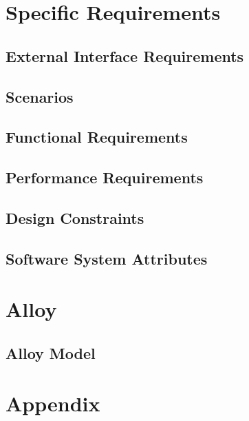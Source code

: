 \documentclass[a4paper,12pt]{report}
\begin{document}
	\chapter{Specific Requirements}
	\label{ch:Specific_Requirements}

	\section{External Interface Requirements}
	

	\section{Scenarios}
	

	\section{Functional Requirements} 
	

	\section{Performance Requirements} 
	

	\section{Design Constraints}
	 
	
	\section{Software System Attributes} 
	


	\chapter{Alloy} 
	\label{ch: alloy}

	\section{Alloy Model}
	
	
	

	\appendix
	\chapter{Appendix}
	
	
\end{document}
